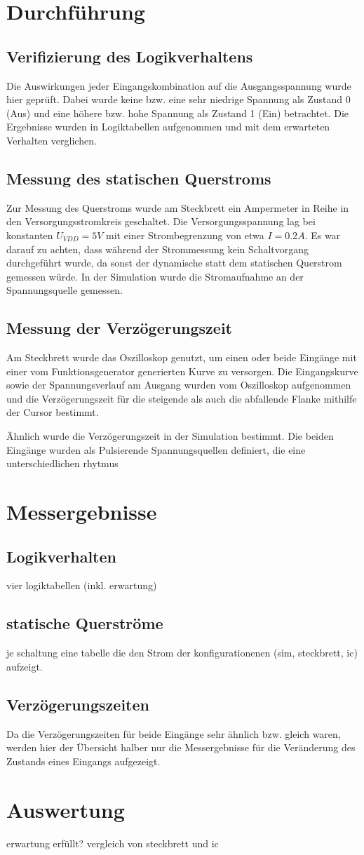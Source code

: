 \documentclass[11pt, a4paper]{article}
\begin{document}
\section*{Durchführung}
\subsection*{Verifizierung des Logikverhaltens}
Die Auswirkungen jeder Eingangskombination auf die Ausgangsspannung wurde hier geprüft. Dabei wurde keine bzw. eine sehr niedrige Spannung als Zustand 0 (Aus) und eine höhere bzw. hohe Spannung als Zustand 1 (Ein) betrachtet. Die Ergebnisse wurden in Logiktabellen aufgenommen und mit dem erwarteten Verhalten verglichen.
\subsection*{Messung des statischen Querstroms}
Zur Messung des Querstroms wurde am Steckbrett ein Ampermeter in Reihe in den Versorgungsstromkreis geschaltet.
Die Versorgungsspannung lag bei konstanten $U_{VDD} = 5V$ mit einer Strombegrenzung von etwa $I = 0.2A$. Es war darauf zu achten, dass während der Strommessung kein Schaltvorgang durchgeführt wurde, da sonst der dynamische statt dem statischen Querstrom gemessen würde.
In der Simulation wurde die Stromaufnahme an der Spannungsquelle gemessen. 
\subsection*{Messung der Verzögerungszeit}
Am Steckbrett wurde das Oszilloskop genutzt, um einen oder beide Eingänge mit einer vom Funktionsgenerator generierten Kurve zu versorgen. Die Eingangskurve sowie der Spannungsverlauf am Ausgang wurden vom Oszilloskop aufgenommen und die Verzögerungszeit für die steigende als auch die abfallende Flanke mithilfe der Cursor bestimmt.

Ähnlich wurde die Verzögerungszeit in der Simulation bestimmt. Die beiden Eingänge wurden als Pulsierende Spannungsquellen definiert, die eine unterschiedlichen rhytmus
\section*{Messergebnisse}
\subsection*{Logikverhalten}
vier logiktabellen (inkl. erwartung)
\subsection*{statische Querströme}
je schaltung eine tabelle die den Strom der konfigurationenen (sim, steckbrett, ic) aufzeigt.
\subsection*{Verzögerungszeiten}
Da die Verzögerungszeiten für beide Eingänge sehr ähnlich bzw. gleich waren, werden hier der Übersicht halber nur die Messergebnisse für die Veränderung des Zustands eines Eingangs aufgezeigt.
\section*{Auswertung}
erwartung erfüllt? vergleich von steckbrett und ic
\end{document}
